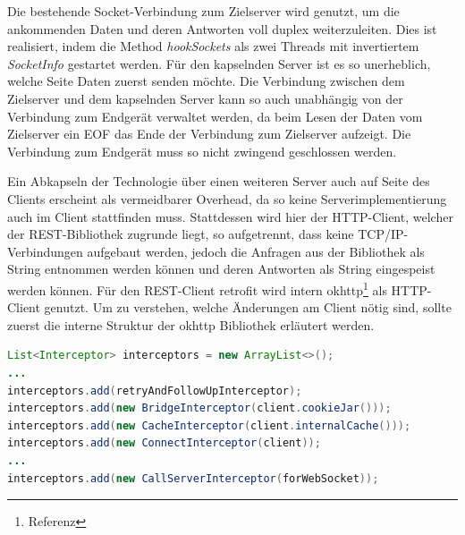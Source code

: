 \documentclass[12pt,a4paper]{article}
\begin{document}
        Die bestehende Socket-Verbindung zum Zielserver wird genutzt, um die ankommenden Daten und deren Antworten voll duplex weiterzuleiten. Dies ist realisiert, indem die Method {\it hookSockets} als zwei Threads mit invertiertem {\it SocketInfo} gestartet werden. Für den kapselnden Server ist es so unerheblich, welche Seite Daten zuerst senden möchte. Die Verbindung zwischen dem Zielserver und dem kapselnden Server kann so auch unabhängig von der Verbindung zum Endgerät verwaltet werden, da beim Lesen der Daten vom Zielserver ein EOF das Ende der Verbindung zum Zielserver aufzeigt. Die Verbindung zum Endgerät muss so nicht zwingend geschlossen werden.

        
        Ein Abkapseln der Technologie über einen weiteren Server auch auf Seite des Clients erscheint als vermeidbarer Overhead, da so keine Serverimplementierung auch im Client stattfinden muss. Stattdessen wird hier der HTTP-Client, welcher der REST-Bibliothek zugrunde liegt, so aufgetrennt, dass keine TCP/IP-Verbindungen aufgebaut werden, jedoch die Anfragen aus der Bibliothek als String entnommen werden können und  deren Antworten als String eingespeist werden können. Für den REST-Client retrofit wird intern okhttp\footnote{Referenz} als HTTP-Client genutzt. Um zu verstehen, welche Änderungen am Client nötig sind, sollte zuerst die interne Struktur der okhttp Bibliothek erläutert werden.
        \begin{lstlisting}[language=Java, caption=Interner Aufbau von okhttp (Client: Java)]
List<Interceptor> interceptors = new ArrayList<>();
...
interceptors.add(retryAndFollowUpInterceptor);
interceptors.add(new BridgeInterceptor(client.cookieJar()));
interceptors.add(new CacheInterceptor(client.internalCache()));
interceptors.add(new ConnectInterceptor(client));
...
interceptors.add(new CallServerInterceptor(forWebSocket));
        \end{lstlisting}
\end{document}
